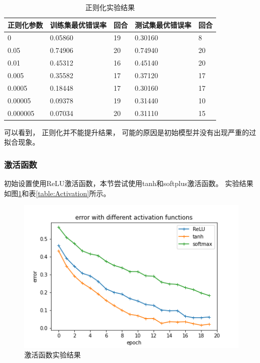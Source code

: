 \documentclass{article}
\begin{document}
\begin{table}[h]
\centering
\begin{tabular}{|l|l|l|l|l|} 
\hline
正则化参数 & 训练集最优错误率 & 回合 & 测试集最优错误率 & 回合 \\
\hline
0 & 0.05860 & 19 & 0.30160 & 8 \\
0.05 & 0.74906 & 20 & 0.74940 & 20 \\
0.01 & 0.45312 & 16 & 0.45140 & 20 \\
0.005 & 0.35582 & 17 & 0.37120 & 17 \\
0.0005 & 0.18448 & 17 & 0.30160 & 17 \\
0.00005 & 0.09378 & 19 & 0.31440 & 10 \\
0.000005 & 0.07034 & 20 & 0.31110 & 15 \\
\hline
\end{tabular}
\caption{正则化实验结果}
\label{table:Regularize}
\end{table}

可以看到，
正则化并不能提升结果，
可能的原因是初始模型并没有出现严重的过拟合现象。

\subsubsection{激活函数}

初始设置使用ReLU激活函数，本节尝试使用tanh和softplus激活函数。
实验结果如图\ref{fig:Activation}和表\ref{table:Activation}所示。

\begin{figure}[p]
\includegraphics[width=\textwidth]
{Result/NN softplus/figure.png}
\caption{激活函数实验结果}
\label{fig:Activation}
\end{figure}
\end{document}
